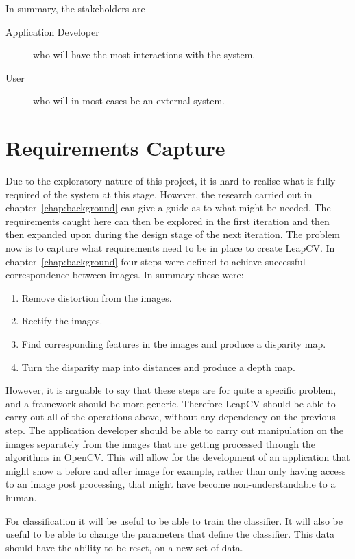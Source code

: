 \documentclass[11pt,oneside]{report}
\begin{document}
			In summary, the stakeholders are
			\begin{description}
			\item[Application Developer] who will have the most interactions with the system.
			\item[User] who will in most cases be an external system.
			\end{description}
		
		\section{Requirements Capture}
			Due to the exploratory nature of this project, it is hard to realise what is fully required of the system at this stage.
			However, the research carried out in chapter~\ref{chap:background} can give a guide as to what might be needed.
			The requirements caught here can then be explored in the first iteration and then then expanded upon during the design stage of the next iteration.
			The problem now is to capture what requirements need to be in place to create LeapCV.
			In chapter~\ref{chap:background} four steps were defined to achieve successful correspondence between images.
			In summary these were:
			\begin{enumerate}
				\item Remove distortion from the images.
				\item Rectify the images.
				\item Find corresponding features in the images and produce a disparity map.
				\item Turn the disparity map into distances and produce a depth map.
			\end{enumerate}
			However, it is arguable to say that these steps are for quite a specific problem, and a framework should be more generic.
			Therefore LeapCV should be able to carry out all of the operations above, without any dependency on the previous step.
			The application developer should be able to carry out manipulation on the images separately from the images that are getting processed through the algorithms in OpenCV.
			This will allow for the development of an application that might show a before and after image for example, rather than only having access to an image post processing, that might have become non-understandable to a human.
			
			For classification it will be useful to be able to train the classifier.
			It will also be useful to be able to change the parameters that define the classifier.
			This data should have the ability to be reset, on a new set of data.
			
\end{document}

